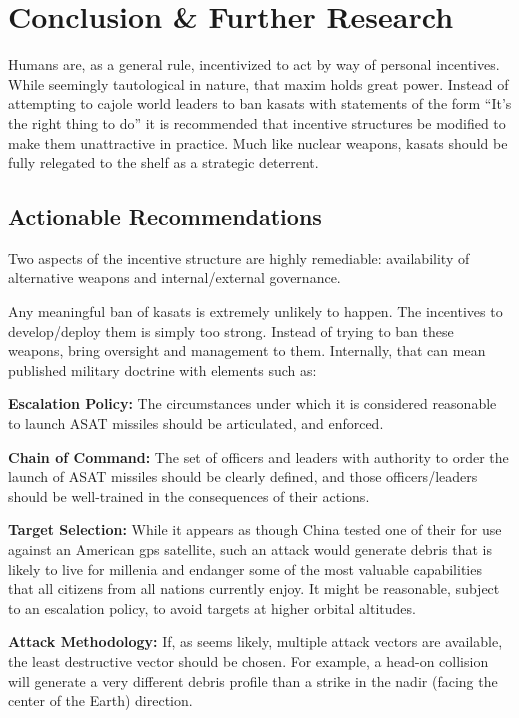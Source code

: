 \section{Conclusion \& Further Research}

Humans are, as a general rule, incentivized to act by way of personal
incentives.  While seemingly tautological in nature, that maxim holds
great power.  Instead of attempting to cajole world leaders to ban
\acp{kasat} with statements of the form ``It's the right thing to do''
it is recommended that incentive structures be modified to make them
unattractive in practice.  Much like nuclear weapons, \acp{kasat}
should be fully relegated to the shelf as a strategic deterrent.

\subsection{Actionable Recommendations}

Two aspects of the incentive structure are highly remediable:
availability of alternative weapons and internal/external governance.

Any meaningful ban of \acp{kasat} is extremely unlikely to happen.
The incentives to develop/deploy them is simply too strong.  Instead
of trying to ban these weapons, bring oversight and management to
them.  Internally, that can mean published military doctrine with
elements such as:

\textbf{Escalation Policy:} The circumstances under which it is
considered reasonable to launch ASAT missiles should be articulated,
and enforced.

\textbf{Chain of Command:} The set of officers and leaders with
authority to order the launch of ASAT missiles should be clearly
defined, and those officers/leaders should be well-trained in the
consequences of their actions.

\textbf{Target Selection:} While it appears as though China tested one
of their  for use against an American \ac{gps} satellite,
such an attack would generate debris that is likely to live for
millenia and endanger some of the most valuable capabilities that all
citizens from all nations currently enjoy.  It might be reasonable,
subject to an escalation policy, to avoid targets at higher orbital
altitudes.

\textbf{Attack Methodology:} If, as seems likely, multiple attack
vectors are available, the least destructive vector should be chosen.
For example, a head-on collision will generate a very different debris
profile than a strike in the nadir (facing the center of the Earth)
direction.

